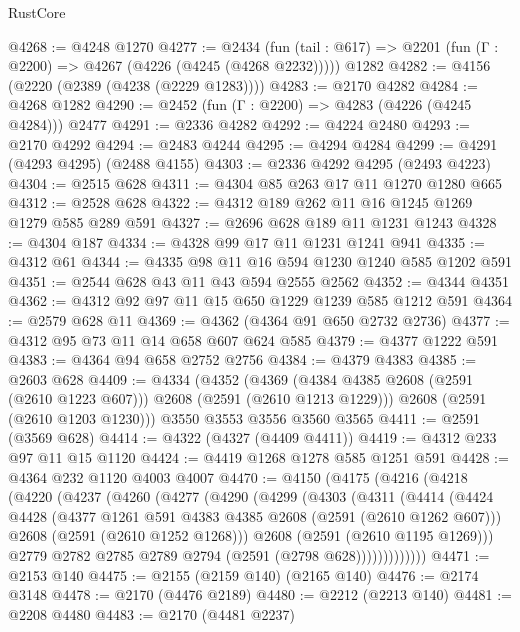 \begin{lexlean}{RustCore}
\begin{coremodule}
@4268 := @4248 @1270
@4277 := @2434
    (fun (tail : @617) => @2201 (fun (Γ : @2200) => @4267 (@4226 (@4245 (@4268 @2232)))))
    @1282
@4282 := @4156 (@2220 (@2389 (@4238 (@2229 @1283))))
@4283 := @2170 @4282
@4284 := @4268 @1282
@4290 := @2452 (fun (Γ : @2200) => @4283 (@4226 (@4245 @4284))) @2477
@4291 := @2336 @4282
@4292 := @4224 @2480
@4293 := @2170 @4292
@4294 := @2483 @4244
@4295 := @4294 @4284
@4299 := @4291 (@4293 @4295) (@2488 @4155)
@4303 := @2336 @4292 @4295 (@2493 @4223)
@4304 := @2515 @628
@4311 := @4304 @85 @263 @17 @11 @1270 @1280 @665
@4312 := @2528 @628
@4322 := @4312 @189 @262 @11 @16 @1245 @1269 @1279 @585 @289 @591
@4327 := @2696 @628 @189 @11 @1231 @1243
@4328 := @4304 @187
@4334 := @4328 @99 @17 @11 @1231 @1241 @941
@4335 := @4312 @61
@4344 := @4335 @98 @11 @16 @594 @1230 @1240 @585 @1202 @591
@4351 := @2544 @628 @43 @11 @43 @594 @2555 @2562
@4352 := @4344 @4351
@4362 := @4312 @92 @97 @11 @15 @650 @1229 @1239 @585 @1212 @591
@4364 := @2579 @628 @11
@4369 := @4362 (@4364 @91 @650 @2732 @2736)
@4377 := @4312 @95 @73 @11 @14 @658 @607 @624 @585
@4379 := @4377 @1222 @591
@4383 := @4364 @94 @658 @2752 @2756
@4384 := @4379 @4383
@4385 := @2603 @628
@4409 := @4334
    (@4352
      (@4369 (@4384 @4385 @2608 (@2591 (@2610 @1223 @607))) @2608 (@2591 (@2610 @1213 @1229)))
      @2608
      (@2591 (@2610 @1203 @1230)))
    @3550
    @3553
    @3556
    @3560
    @3565
@4411 := @2591 (@3569 @628)
@4414 := @4322 (@4327 (@4409 @4411))
@4419 := @4312 @233 @97 @11 @15 @1120
@4424 := @4419 @1268 @1278 @585 @1251 @591
@4428 := @4364 @232 @1120 @4003 @4007
@4470 := @4150
    (@4175
      (@4216
        (@4218
          (@4220
            (@4237
              (@4260
                (@4277
                  (@4290
                    (@4299
                      (@4303
                        (@4311
                          (@4414
                            (@4424
                              @4428
                              (@4377 @1261 @591 @4383 @4385 @2608 (@2591 (@2610 @1262 @607)))
                              @2608
                              (@2591 (@2610 @1252 @1268)))
                            @2608
                            (@2591 (@2610 @1195 @1269)))
                          @2779
                          @2782
                          @2785
                          @2789
                          @2794
                          (@2591 (@2798 @628)))))))))))))
@4471 := @2153 @140
@4475 := @2155 (@2159 @140) (@2165 @140)
@4476 := @2174 @3148
@4478 := @2170 (@4476 @2189)
@4480 := @2212 (@2213 @140)
@4481 := @2208 @4480
@4483 := @2170 (@4481 @2237)

\end{coremodule}
\end{lexlean}
